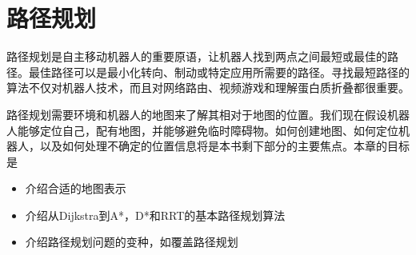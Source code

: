 \chapter{路径规划}
\label{chap:pathplanning}

路径规划是自主移动机器人的重要原语，让机器人找到两点之间最短或最佳的路径。最佳路径可以是最小化转向、制动或特定应用所需要的路径。寻找最短路径的算法不仅对机器人技术，而且对网络路由、视频游戏和理解蛋白质折叠都很重要。


路径规划需要环境和机器人的地图来了解其相对于地图的位置。我们现在假设机器人能够定位自己，配有地图，并能够避免临时障碍物。如何创建地图、如何定位机器人，以及如何处理不确定的位置信息将是本书剩下部分的主要焦点。本章的目标是

\begin{itemize}

\item 介绍合适的地图表示
\item 介绍从Dijkstra到A*，D*和RRT的基本路径规划算法
\item 介绍路径规划问题的变种，如覆盖路径规划
\end{itemize}

